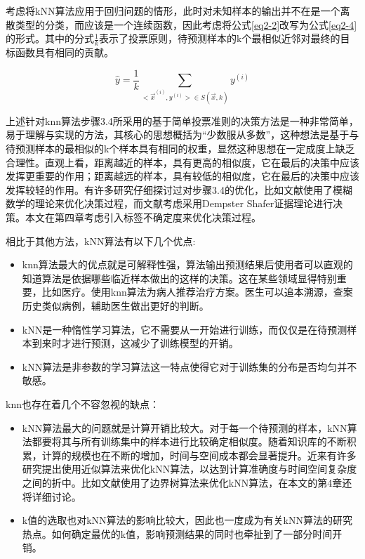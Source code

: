 考虑将kNN算法应用于回归问题的情形，此时对未知样本的输出并不在是一个离散类型的分类，而应该是一个连续函数，因此考虑将公式\ref{eq2-2}改写为公式\ref{eq2-4}的形式。其中的分式$\frac{1}{k}$表示了投票原则，待预测样本的k个最相似近邻对最终的目标函数具有相同的贡献。



\begin{equation}
\label{eq2-4}
\hat{y}=\frac{1}{k} \sum_{{<\Vec{x}^{(i)},y^{(i)}>}\in S(\Vec{x},k)} y^{(i)}
\end{equation}

上述针对knn算法步骤3.4所采用的基于简单投票准则的决策方法是一种非常简单，易于理解与实现的方法，其核心的思想概括为“少数服从多数”，这种想法是基于与待预测样本的最相似的k个样本具有相同的权重，显然这种思想在一定成度上缺乏合理性。直观上看，距离越近的样本，具有更高的相似度，它在最后的决策中应该发挥更重要的作用；距离越远的样本，具有较低的相似度，它在最后的决策中应该发挥较轻的作用。有许多研究仔细探讨过对步骤3.4的优化，比如文献\parencite[]{ShenFuzzy,Rosa2003Data,RenThe}使用了模糊数学的理论来优化决策过程，而文献\parencite{Ali2011Improved}考虑采用Dempster Shafer证据理论进行决策。本文在第四章考虑引入标签不确定度来优化决策过程。

相比于其他方法，kNN算法有以下几个优点:
\begin{itemize}

\item knn算法最大的优点就是可解释性强，算法输出预测结果后使用者可以直观的知道算法是依据哪些临近样本做出的这样的决策。这在某些领域显得特别重要，比如医疗。使用knn算法为病人推荐治疗方案。医生可以追本溯源，查案历史类似病例，辅助医生做出更好的判断。

\item kNN是一种惰性学习算法，它不需要从一开始进行训练，而仅仅是在待预测样本到来时才进行预测，这减少了训练模型的开销。

\item kNN算法是非参数的学习算法这一特点使得它对于训练集的分布是否均匀并不敏感。

\end{itemize}

knn也存在着几个不容忽视的缺点：

\begin{itemize}

\item kNN算法最大的问题就是计算开销比较大。对于每一个待预测的样本，kNN算法都要将其与所有训练集中的样本进行比较确定相似度。随着知识库的不断积累，计算的规模也在不断的增加，时间与空间成本都会显著提升。近来有许多研究提出使用近似算法来优化kNN算法，以达到计算准确度与时间空间复杂度之间的折中。比如文献\parencite{MathyThe}使用了边界树算法来优化kNN算法，在本文的第4章还将详细讨论。

\item k值的选取也对kNN算法的影响比较大，因此也一度成为有关kNN算法的研究热点\cite{article}。如何确定最优的k值，影响预测结果的同时也牵扯到了一部分时间开销。

\end{itemize}

